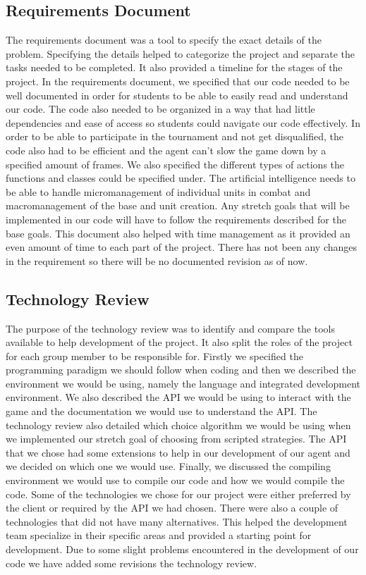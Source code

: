 \documentclass[10pt,letterpaper,onecolumn,draftclsnofoot]{IEEEtran}
\begin{document}
	\subsection{Requirements Document}
	The requirements document was a tool to specify the exact details of the problem. Specifying the details helped to categorize the project and separate the tasks needed to be completed. It also provided a timeline for the stages of the project. In the requirements document, we specified that our code needed to be well documented in order for students to be able to easily read and understand our code. The code also needed to be organized in a way that had little dependencies and ease of access so students could navigate our code effectively. In order to be able to participate in the tournament and not get disqualified, the code also had to be efficient and the agent can’t slow the game down by a specified amount of frames. We also specified the different types of actions the functions and classes could be specified under. The artificial intelligence needs to be able to handle micromanagement of individual units in combat and macromanagement of the base and unit creation. Any stretch goals that will be implemented in our code will have to follow the requirements described for the base goals. This document also helped with time management as it provided an even amount of time to each part of the project. There has not been any changes in the requirement so there will be no documented revision as of now.

	\subsection{Technology Review}
	The purpose of the technology review was to identify and compare the tools available to help development of the project. It also split the roles of the project for each group member to be responsible for. Firstly we specified the programming paradigm we should follow when coding and then we described the environment we would be using, namely the language and integrated development environment. We also described the API we would be using to interact with the game and the documentation we would use to understand the API. The technology review also detailed which choice algorithm we would be using when we implemented our stretch goal of choosing from scripted strategies. The API that we chose had some extensions to help in our development of our agent and we decided on which one we would use. Finally, we discussed the compiling environment we would use to compile our code and how we would compile the code. Some of the technologies we chose for our project were either preferred by the client or required by the API we had chosen. There were also a couple of technologies that did not have many alternatives. This helped the development team specialize in their specific areas and provided a starting point for development. Due to some slight problems encountered in the development of our code we have added some revisions the technology review.
\end{document}
